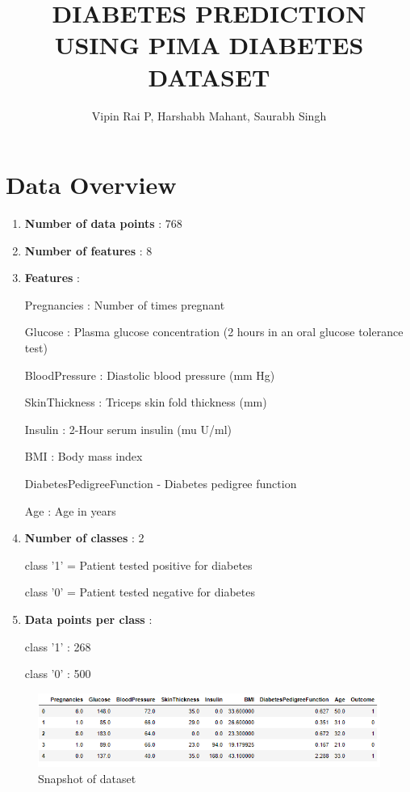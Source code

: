 \documentclass[12pt]{article}
\begin{document}
 
 
\title{DIABETES PREDICTION USING PIMA DIABETES DATASET}
\author{Vipin Rai P, Harshabh Mahant, Saurabh Singh\\
}

\maketitle
\section{Data Overview}
\begin{enumerate}
\item \textbf{Number of data points} : 768
\item \textbf{Number of features} : 8
\item \textbf{Features} :

Pregnancies : Number of times pregnant

Glucose : Plasma glucose concentration (2 hours in an oral glucose tolerance test)

BloodPressure : Diastolic blood pressure (mm Hg)

SkinThickness : Triceps skin fold thickness (mm)

Insulin : 2-Hour serum insulin (mu U/ml)

BMI : Body mass index

DiabetesPedigreeFunction - Diabetes pedigree function

Age : Age in years

\item \textbf{Number of classes} : 2

class '1' = Patient tested positive for diabetes

class '0' = Patient tested negative for diabetes \\

\item \textbf{Data points per class} :

class '1' : 268

class '0' : 500

\end{enumerate}

\begin{figure}[h]
\centering
\includegraphics[scale=0.65]{df_head.PNG} 
\caption{Snapshot of dataset}
\label{etiqueta}
\end{figure}
\end{document}
